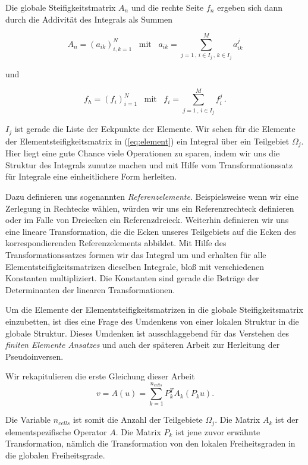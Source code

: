 Die globale Steifigkeitstmatrix $A_n$ und die rechte Seite $f_n$ ergeben sich dann durch die Addivität des Integrals als Summen

\begin{equation*}
A_n = (a_{ik})_{i,k=1}^{N} \, \, \, \text{ mit } \, \, \, a_{ik} = \sum_{j=1 \, , \, i \in I_j \, , \, k \in I_j }^M a_{ik}^j  
\end{equation*}

und

\begin{equation*}
f_h = (f_i)_{i=1}^{N} \, \, \, \text{ mit } \, \, \, f_i = \sum_{j=1 \, , \, i \in I_j}^M f_i^j \, .
\end{equation*}

$I_j$ ist gerade die Liste der Eckpunkte der Elemente.
Wir sehen für die Elemente der Elementsteifigkeitsmatrix in (\ref{eq:element}) ein Integral über ein Teilgebiet $\Omega_j$. Hier liegt eine gute Chance viele Operationen zu sparen, indem wir uns die Struktur des Integrals zunutze machen und mit Hilfe vom Transformationssatz für Integrale eine einheitlichere Form herleiten.

Dazu definieren uns sogenannten \textit{Referenzelemente}. Beispielsweise wenn wir eine Zerlegung in Rechtecke wählen, würden wir uns ein Referenzrechteck definieren oder im Falle von Dreiecken ein Referenzdreieck. Weiterhin definieren wir uns eine lineare Transformation, die die Ecken unseres Teilgebiets auf die Ecken des korrespondierenden Referenzelements abbildet. Mit Hilfe des Transformationssatzes formen wir das Integral um und erhalten für alle Elementsteifigkeitsmatrizen dieselben Integrale, bloß mit verschiedenen Konstanten multipliziert. Die Konstanten sind gerade die Beträge der Determinanten der linearen Transformationen.

Um die Elemente der Elementsteifigkeitsmatrizen in die globale Steifigkeitsmatrix einzubetten, ist dies eine Frage des Umdenkens von einer lokalen Struktur in die globale Struktur.
Dieses Umdenken ist ausschlaggebend für das Verstehen des \textit{finiten Elemente Ansatzes} und auch der späteren Arbeit zur Herleitung der Pseudoinversen.

Wir rekapitulieren die erste Gleichung dieser Arbeit
\begin{equation} \label{eq:main2}
v=A(u)=\sum_{k=1}^{n_{cells}} P_k^T A_k (P_k u).
\end{equation}

Die Variable $n_{cells}$ ist somit die Anzahl der Teilgebiete $\Omega_j$. Die Matrix $A_k$ ist der elementspezifische Operator $A$. Die Matrix $P_k$ ist jene zuvor erwähnte Transformation, nämlich die Transformation von den lokalen Freiheitsgraden in die globalen Freiheitsgrade.

